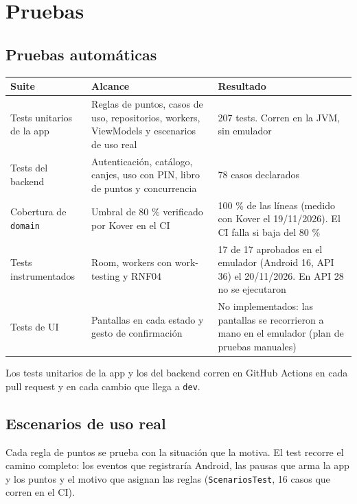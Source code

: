 \section{Pruebas}

\subsection{Pruebas automáticas}

\begin{tabularx}{\linewidth}{@{}L L L@{}}
\toprule
Suite & Alcance & Resultado \\
\midrule
Tests unitarios de la app & Reglas de puntos, casos de uso, repositorios, workers, ViewModels y escenarios de uso real & 207 tests. Corren en la JVM, sin emulador \\
Tests del backend & Autenticación, catálogo, canjes, uso con PIN, libro de puntos y concurrencia & 78 casos declarados \\
Cobertura de \texttt{domain} & Umbral de 80 \% verificado por Kover en el CI & 100 \% de las líneas (medido con Kover el 19/11/2026). El CI falla si baja del 80 \% \\
Tests instrumentados & Room, workers con work-testing y RNF04 & 17 de 17 aprobados en el emulador (Android 16, API 36) el 20/11/2026. En API 28 no se ejecutaron \\
Tests de UI & Pantallas en cada estado y gesto de confirmación & No implementados: las pantallas se recorrieron a mano en el emulador (plan de pruebas manuales) \\
\bottomrule
\end{tabularx}

Los tests unitarios de la app y los del backend corren en GitHub Actions en cada pull request y en cada
cambio que llega a \texttt{dev}.

\subsection{Escenarios de uso real}
\label{sec:escenarios}

Cada regla de puntos se prueba con la situación que la motiva. El test recorre el camino completo: los
eventos que registraría Android, las pausas que arma la app y los puntos y el motivo que asignan las
reglas (\texttt{ScenariosTest}, 16 casos que corren en el CI).

